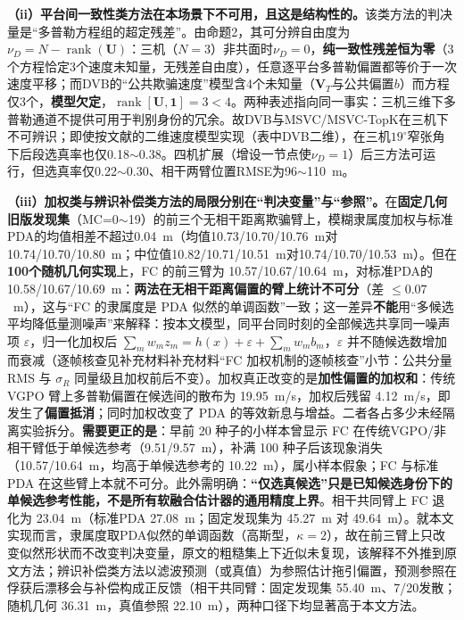 \documentclass[UTF8,a4paper,zihao=-4]{ctexart}
\begin{document}
\noindent\textbf{（ii）平台间一致性类方法在本场景下不可用，且这是结构性的。}\quad 该类方法的判决量是“多普勒方程组的超定残差”。由命题2，其可分辨自由度为$\nu_D=N-\operatorname{rank}(\boldsymbol U)$：三机（$N=3$）非共面时$\nu_D=0$，\textbf{纯一致性残差恒为零}（3个方程恰定3个速度未知量，无残差自由度），任意逐平台多普勒偏置都等价于一次速度平移；而DVB\cite{li2024}的“公共欺骗速度”模型含4个未知量（$\boldsymbol V_T$与公共偏置$b$）而方程仅3个，\textbf{模型欠定}，$\operatorname{rank}[\boldsymbol U,\mathbf 1]=3<4$。两种表述指向同一事实：三机三维下多普勒通道不提供可用于判别身份的冗余。故DVB与MSVC/MSVC-TopK在三机下不可辨识；即使按文献\cite{li2024}的二维速度模型实现（表中DVB二维），在三机$19^\circ$窄张角下后段选真率也仅0.18$\sim$0.38。四机扩展（增设一节点使$\nu_D=1$）后三方法可运行，但选真率仅0.22$\sim$0.30、相干两臂位置RMSE为96$\sim$110~m。

\noindent\textbf{（iii）加权类与辨识补偿类方法的局限分别在“判决变量”与“参照”。}\quad 在\textbf{固定几何旧版发现集}（MC=0$\sim$19）的前三个无相干距离欺骗臂上，模糊隶属度加权\cite{rough2018}与标准PDA的均值相差不超过0.04~m（均值10.73/10.70/10.76~m对10.74/10.70/10.80~m；中位值10.82/10.71/10.51~m对10.74/10.70/10.53~m）。但在\textbf{100个随机几何实现}上，FC 的前三臂为 10.57/10.67/10.64~m，对标准PDA的 10.58/10.67/10.69~m：\textbf{两法在无相干距离偏置的臂上统计不可分}（差 $\le0.07$~m），这与“FC 的隶属度是 PDA 似然的单调函数”一致；这一差异\textbf{不能}用“多候选平均降低量测噪声”来解释：按本文模型，同平台同时刻的全部候选共享同一噪声项 $\varepsilon$，归一化加权后 $\sum_m w_m z_m=h(x)+\varepsilon+\sum_m w_m b_m$，$\varepsilon$ 并不随候选数增加而衰减（逐帧核查见补充材料补充材料“FC 加权机制的逐帧核查”小节：公共分量 RMS 与 $\sigma_R$ 同量级且加权前后不变）。加权真正改变的是\textbf{加性偏置的加权和}：传统VGPO 臂上多普勒偏置在候选间的散布为 19.95~m/s，加权后残留 4.12~m/s，即发生了\textbf{偏置抵消}；同时加权改变了 PDA 的等效新息与增益。二者各占多少未经隔离实验拆分。\textbf{需要更正的是}：早前 20 种子的小样本曾显示 FC 在传统VGPO/非相干臂低于单候选参考（9.51/9.57~m），补满 100 种子后该现象消失（10.57/10.64~m，均高于单候选参考的 10.22~m），属小样本假象；FC 与标准PDA 在这些臂上本就不可分。此外需明确：\textbf{“仅选真候选”只是已知候选身份下的单候选参考性能，不是所有软融合估计器的通用精度上界}。相干共同臂上 FC 退化为 23.04~m（标准PDA 27.08~m；固定发现集为 45.27~m 对 49.64~m）。就本文实现而言，隶属度取PDA似然的单调函数（高斯型，$\kappa=2$），故在前三臂上只改变似然形状而不改变判决变量，原文的粗糙集上下近似未复现，该解释不外推到原文方法；辨识补偿类方法\cite{zhao2024,lingadevaru2022}以滤波预测（或真值）为参照估计拖引偏置，预测参照在俘获后漂移会与补偿构成正反馈（相干共同臂：固定发现集 55.40~m、7/20发散；随机几何 36.31~m，真值参照 22.10~m），两种口径下均显著高于本文方法。
\end{document}
